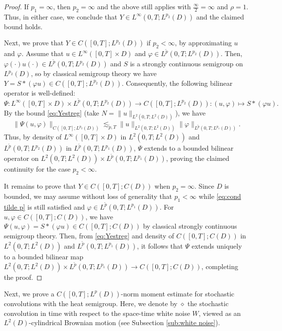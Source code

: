 \documentclass[10pt,a4paper]{amsart}
\numberwithin{equation}{section}
\newcommand{\col}{\colon}
\begin{document}
\begin{proof}
If $p_1=\infty$, then $p_2=\infty$ and the above still applies with $\frac{\infty}{2}=\infty$ and $\rho=1$. 
Thus, in either case, we conclude that $Y\in L^\infty(0,T;L^{p_2}(D))$ and the claimed bound holds. 
 
Next, we prove that $Y\in C([0,T];L^{p_2}(D))$ if $p_2<\infty$, by approximating $u$ and $\varphi$. 
Assume that $u\in L^\infty([0,T]\times D)$ and $\varphi\in L^{\tilde p}(0,T;L^{p_2}(D))$. 
Then, $\varphi(\cdot)u(\cdot)\in L^{\tilde p}(0,T;L^{p_2}(D))$ and $S$ is a strongly continuous semigroup on $L^{p_2}(D)$, so by classical semigroup theory we have $Y=S*(\varphi u)\in C([0,T];L^{p_2}(D))$. Consequently, the following bilinear operator is well-defined:
\[
\Psi \col L^\infty([0,T]\times D)\times L^{\tilde p}(0,T;L^{p_2}(D))\to C([0,T];L^{p_2}(D))\col (u,\varphi)\mapsto S*(\varphi u).
\]
By the bound \eqref{eq:Yestreg} (take $N=\|u\|_{L^2(0,T;L^2(D))}$),  we have 
\begin{equation}\label{eq:skel conv cont}
\|\Psi (u,\varphi)\|_{C([0,T];L^{p_2}(D))}\lesssim_{\tilde p,T} \|u\|_{L^2(0,T;L^2(D))}\|\varphi\|_{L^{\tilde p}(0,T;L^{p_1}(D))}.
\end{equation}
Thus, by density of  $L^\infty([0,T]\times D)$ in $L^2(0,T;L^2(D))$ and $L^{\tilde p}(0,T;L^{p_2}(D))$ in $L^{\tilde p}(0,T;L^{p_1}(D))$, $\Psi$ extends to a bounded bilinear operator on $L^2(0,T;L^2(D))\times L^{\tilde p}(0,T;L^{p_1}(D))$, proving the claimed continuity for the case $p_2<\infty$. 

It remains to prove that $Y \in C([0,T]; C(D))$ when $p_2 = \infty$. Since $D$ is  bounded, we may assume without loss of generality that $p_1 < \infty$ while \eqref{eq:cond tilde p} is still satisfied and $\varphi\in L^{\tilde p}(0,T;L^{p_1}(D))$. 
For $u,\varphi \in C([0,T]; C(D))$, we have $\Psi(u,\varphi)= S*(\varphi u) \in C([0,T];C(D))$ by classical strongly continuous semigroup theory. 
Then, from  \eqref{eq:Yestreg} and density of  $C([0,T];C(D))$  in $L^2(0,T; L^2(D))$ and $L^{\tilde p}(0,T; L^{p_1}(D))$, it follows that $\Psi$ extends uniquely to a bounded bilinear map $L^2(0,T;L^2(D))\times L^{\tilde p}(0,T;L^{p_1}(D))\to C([0,T]; C(D))$, completing the proof. 
\end{proof} 


Next, we prove a $C([0,T];L^p(D))$-norm moment estimate for stochastic convolutions with the heat semigroup. Here, we denote by $\diamond$ the stochastic convolution in time with respect to the space-time white noise $W$, viewed as an $L^2(D)$-cylindrical Brownian motion (see Subsection \ref{sub:white noise}). 
\end{document}
